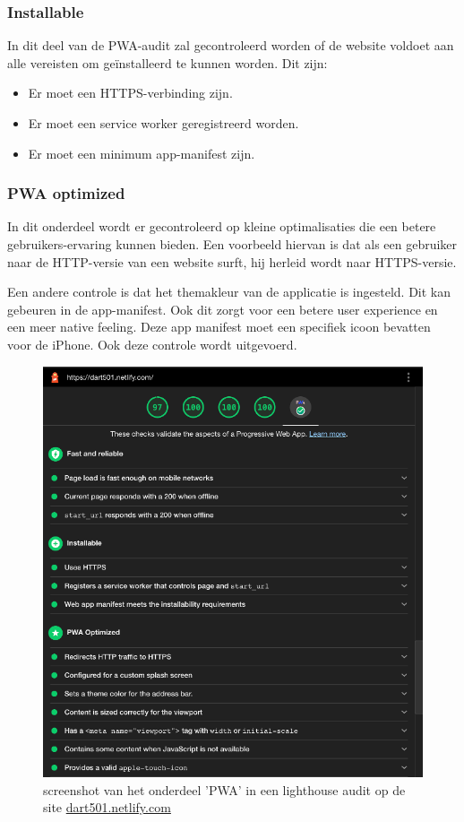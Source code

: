 	
	\subsubsection{Installable}
	
		In dit deel van de PWA-audit zal gecontroleerd worden of de website voldoet aan alle vereisten om geïnstalleerd te kunnen worden. Dit zijn:
		\begin{itemize}
			\item	Er moet een HTTPS-verbinding zijn.
			\item	Er moet een service worker geregistreerd worden.
			\item	Er moet een minimum app-manifest zijn.
		\end{itemize}
		\autocite{web.dev2020a}
		
	
	\subsubsection{PWA optimized}
	
		In dit onderdeel wordt er gecontroleerd op kleine optimalisaties die een betere gebruikers-ervaring kunnen bieden. 
		Een voorbeeld hiervan is dat als een gebruiker naar de HTTP-versie van een website surft, hij herleid wordt naar HTTPS-versie.
		
		Een andere controle is dat het themakleur van de applicatie is ingesteld. Dit kan gebeuren in de app-manifest. Ook dit zorgt voor een betere user experience en een meer native feeling. Deze app manifest moet een specifiek icoon bevatten voor de iPhone. Ook deze controle wordt uitgevoerd.
		
		
		\begin{figure}[H]
			\centering
			\includegraphics{./img/lighthouse.png}
			\caption{screenshot van het onderdeel 'PWA' in een lighthouse audit op de site \href{ https://dart501.netlify.com}{dart501.netlify.com} }
		\end{figure}
		
